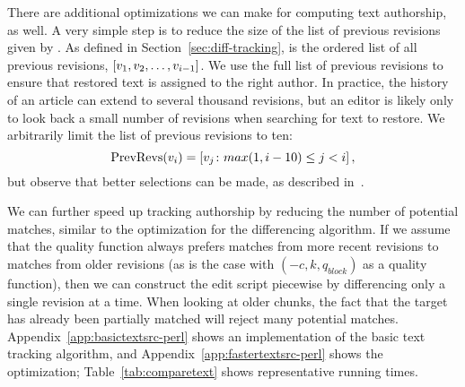 There are additional optimizations we can make for computing
text authorship, as well.
A very simple step is to reduce the size of the list of
previous revisions given by .
As defined in Section~\ref{sec:diff-tracking},  
is the ordered list of all previous revisions,
$\left[ v_{1}, v_{2}, \ldots, v_{i-1} \right]$.
We use the full list of previous revisions to ensure that restored text
is assigned to the right author.
In practice, the history of an article can extend to several thousand
revisions, but an editor is likely only to look back a small number
of revisions when searching for text to restore.
We arbitrarily limit the list of previous revisions to ten:
\begin{equation*}
    \mathrm{PrevRevs}(v_{i}) = \left[ v_{j} \colon
	max(1,i-10) \le j < i \right],
\end{equation*}
but observe that better selections can be made, as described
in~\cite{Chatterjee2008}.

We can further speed up tracking authorship by reducing the number
of potential matches, similar to the optimization for the differencing
algorithm.
If we assume that the quality function always prefers matches from
more recent revisions to matches from older revisions
(as is the case with $(-c, k, q_{block})$ as a quality function),
then we can construct the edit script piecewise by differencing
only a single revision at a time.
When looking at older chunks, the fact that the target has already
been partially matched will reject many potential matches.
Appendix~\ref{app:basictextsrc-perl} shows an implementation of the
basic text tracking algorithm, and Appendix~\ref{app:fastertextsrc-perl}
shows the optimization; Table~\ref{tab:comparetext} shows representative
running times.

